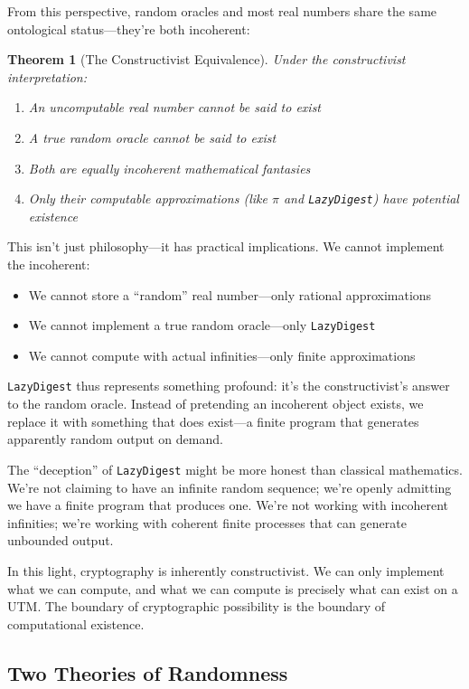 \documentclass[11pt]{article}
\newtheorem{theorem}{Theorem}
\begin{document}
From this perspective, random oracles and most real numbers share the same ontological status---they're both incoherent:

\begin{theorem}[The Constructivist Equivalence]
Under the constructivist interpretation:
\begin{enumerate}
\item An uncomputable real number cannot be said to exist
\item A true random oracle cannot be said to exist
\item Both are equally incoherent mathematical fantasies
\item Only their computable approximations (like $\pi$ and \texttt{LazyDigest}) have potential existence
\end{enumerate}
\end{theorem}

This isn't just philosophy---it has practical implications. We cannot implement the incoherent:
\begin{itemize}
\item We cannot store a ``random'' real number---only rational approximations
\item We cannot implement a true random oracle---only \texttt{LazyDigest}
\item We cannot compute with actual infinities---only finite approximations
\end{itemize}

\texttt{LazyDigest} thus represents something profound: it's the constructivist's answer to the random oracle. Instead of pretending an incoherent object exists, we replace it with something that does exist---a finite program that generates apparently random output on demand.

The ``deception'' of \texttt{LazyDigest} might be more honest than classical mathematics. We're not claiming to have an infinite random sequence; we're openly admitting we have a finite program that produces one. We're not working with incoherent infinities; we're working with coherent finite processes that can generate unbounded output.

In this light, cryptography is inherently constructivist. We can only implement what we can compute, and what we can compute is precisely what can exist on a UTM. The boundary of cryptographic possibility is the boundary of computational existence.

\subsection{Two Theories of Randomness}
\end{document}

